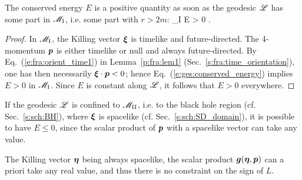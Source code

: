 \begin{prop}
\label{p:ges:E_positive_M_I}
The conserved energy $E$ is a positive
quantity as soon as the geodesic $\mathscr{L}$ has some part in $\mathscr{M}_{\rm I}$, i.e.
some part with $r>2m$:
\be \label{e:ges:E_positive_M_I}
    \Li \cap \M_{\rm I} \neq \varnothing \quad \Longrightarrow \quad E > 0 .
\ee
\end{prop}
\begin{proof}
In $\mathscr{M}_{\rm I}$, the Killing vector $\bm{\xi}$ is timelike and future-directed.
The 4-momentum $\bm{p}$ is either timelike or null and always future-directed.
By Eq.~(\ref{e:fra:orient_time1}) in Lemma~\ref{p:fra:lem1} (Sec.~\ref{s:fra:time_orientation}), one has then necessarily $\bm{\xi}\cdot\bm{p} < 0$; hence Eq.~(\ref{e:ges:conserved_energy})
implies $E > 0$ in $\mathscr{M}_{\rm I}$. Since $E$ is constant along $\mathscr{L}$, it
follows that $E > 0$ everywhere.
\end{proof}
\begin{remark}
If the geodesic $\mathscr{L}$ is confined to $\mathscr{M}_{\rm II}$, i.e. to the black hole
region (cf. Sec.~\ref{s:sch:BH}),
where $\bm{\xi}$ is spacelike (cf. Sec.~\ref{s:sch:SD_domain}),
it is possible to have $E \leq 0$, since the
scalar product of $\bm{p}$ with a spacelike vector can take any value.
\end{remark}
\begin{remark}\label{r:ges:L_any_sign}
The Killing vector $\bm{\eta}$ being always spacelike,
the scalar product $\bm{g}(\bm{\eta},\bm{p})$ can a priori take any real value, and
thus there is no constraint
on the sign of $L$.
\end{remark}

